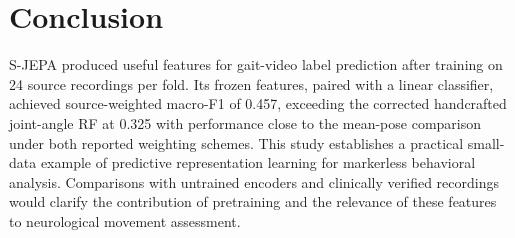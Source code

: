 \documentclass[10pt,twocolumn,letterpaper]{article}
\begin{document}
\section{Conclusion}
S-JEPA produced useful features for gait-video label prediction after training on 24 source recordings per fold. Its frozen features, paired with a linear classifier, achieved source-weighted macro-F1 of 0.457, exceeding the corrected handcrafted joint-angle RF at 0.325 with performance close to the mean-pose comparison under both reported weighting schemes. This study establishes a practical small-data example of predictive representation learning for markerless behavioral analysis. Comparisons with untrained encoders and clinically verified recordings would clarify the contribution of pretraining and the relevance of these features to neurological movement assessment.


\FloatBarrier


\end{document}
